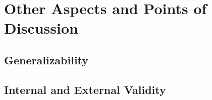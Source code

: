 

\section{Other Aspects and Points of Discussion}





\subsection{Generalizability}








\subsection{Internal and External Validity}

























